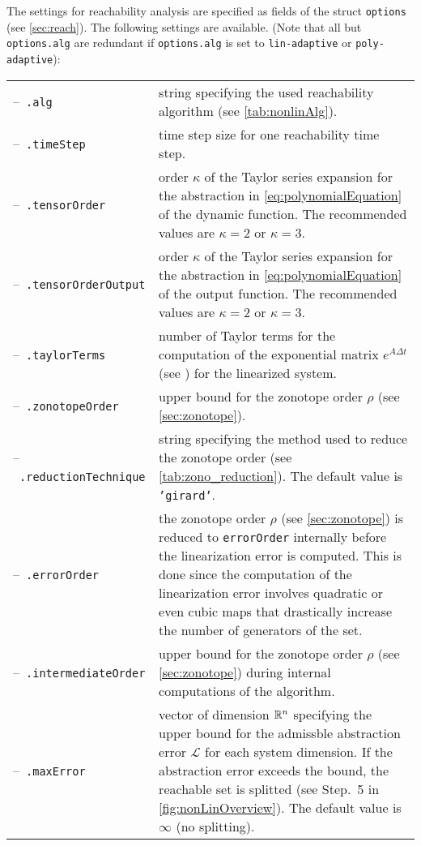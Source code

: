 The settings for reachability analysis are specified as fields of the struct \texttt{options} (see \cref{sec:reach}). The following settings are available. (Note that all but \texttt{options.alg} are redundant if \texttt{options.alg} is set to \texttt{lin-adaptive} or \texttt{poly-adaptive}):
\begin{center}
\renewcommand{\arraystretch}{1.3}
\begin{longtable}[t]{l p{10cm}}	
	--~\texttt{.alg} & string specifying the used reachability algorithm (see \cref{tab:nonlinAlg}). \\
	--~\texttt{.timeStep} & time step size for one reachability time step. \\
	--~\texttt{.tensorOrder} & order $\kappa$ of the Taylor series expansion for the abstraction in \eqref{eq:polynomialEquation} of the dynamic function. The recommended values are $\kappa = 2$ or $\kappa = 3$. \\
	--~\texttt{.tensorOrderOutput} & order $\kappa$ of the Taylor series expansion for the abstraction in \eqref{eq:polynomialEquation} of the output function. The recommended values are $\kappa = 2$ or $\kappa = 3$. \\
	--~\texttt{.taylorTerms} & number of Taylor terms for the computation of the exponential matrix $e^{A\Delta t}$ (see \cite[Eq. (3.2)]{Althoff2010a}) for the linearized system. \\
	--~\texttt{.zonotopeOrder} & upper bound for the zonotope order $\rho$ (see \cref{sec:zonotope}). \\
	--~\texttt{.reductionTechnique} & string specifying the method used to reduce the zonotope order (see \cref{tab:zono_reduction}). The default value is \texttt{'girard'}. \\
	--~\texttt{.errorOrder} & the zonotope order $\rho$ (see \cref{sec:zonotope}) is reduced to \texttt{errorOrder} internally before the linearization error is computed. This is done since the computation of the linearization error involves quadratic or even cubic maps that drastically increase the number of generators of the set. \\
	--~\texttt{.intermediateOrder} & upper bound for the zonotope order $\rho$ (see \cref{sec:zonotope}) during internal computations of the algorithm. \\
	--~\texttt{.maxError} & vector of dimension $\mathbb{R}^n$ specifying the upper bound for the admissble abstraction error $\mathcal{L}$ for each system dimension. If the abstraction error exceeds the bound, the reachable set is splitted (see Step.~5 in \cref{fig:nonLinOverview}). The default value is $\infty$ (no splitting).\\

\end{longtable}
\end{center}
